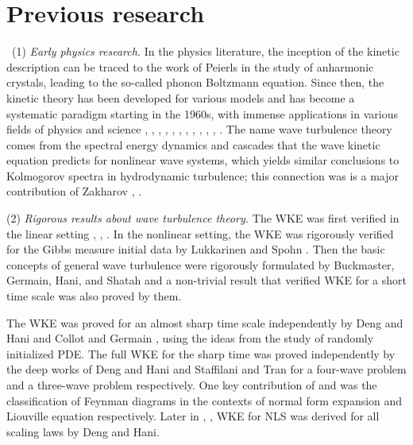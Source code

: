 \section{Previous research}


\quad\, (1) \textit{Early physics research.} In the physics literature, the inception of the kinetic description can be traced to the work of Peierls \cite{peierls1929kinetischen} in the study of anharmonic crystals, leading to the so-called phonon Boltzmann equation. Since then, the kinetic theory has been developed for various models and has become a systematic paradigm starting in the 1960s, with immense applications in various fields of physics and science \cite{benney1969random}, \cite{benney1966nonlinear}, \cite{davidson2012methods}, \cite{hasselmann1962non}, \cite{hasselmann1963non}, \cite{janssen2008progress}, \cite{nazarenko2011wave}, \cite{world1998guide}, \cite{spohn2006phonon}, \cite{spohn2008boltzmann}, \cite{vedenov1967theory}, \cite{zaslavskii1967limits}. The name wave turbulence theory comes from the spectral energy dynamics and cascades that the wave kinetic equation predicts for nonlinear wave systems, which yields similar conclusions to Kolmogorov spectra in hydrodynamic turbulence; this connection was is a major contribution of Zakharov \cite{zakharov2012kolmogorov}, \cite{zakharov1965weak}.

(2) \textit{Rigorous results about wave turbulence theory.} The WKE was first verified in the linear setting \cite{erdHos2000linear}, \cite{erdHos2008quantum}, \cite{soffer2020energy}. In the nonlinear setting, the WKE was rigorously verified for the Gibbs measure initial data by Lukkarinen and Spohn \cite{lukkarinen2011weakly}. Then the basic concepts of general wave turbulence were rigorously formulated by Buckmaster, Germain, Hani, and Shatah \cite{buckmaster2021onset} and a non-trivial result that verified WKE for a short time scale was also proved by them. 

The WKE was proved for an almost sharp time scale independently by Deng and Hani \cite{deng2021derivation} and Collot and Germain \cite{collot2019derivation}, \cite{collot2020derivation} using the ideas from the study of randomly initialized PDE. The full WKE for the sharp time was proved independently by the deep works of Deng and Hani \cite{deng2021full} and Staffilani and Tran \cite{staffilani2021wave} for a four-wave problem and a three-wave problem respectively. One key contribution of \cite{deng2021full} and \cite{staffilani2021wave} was the classification of Feynman diagrams in the contexts of normal form expansion and Liouville equation respectively. Later in \cite{deng2022rigorous}, \cite{deng2023derivation}, WKE for NLS was derived for all scaling laws by Deng and Hani.


